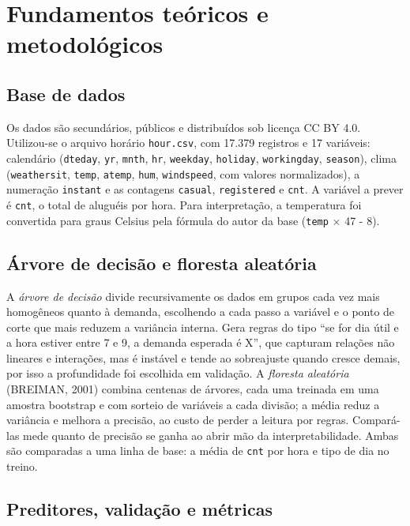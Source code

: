 \documentclass[
  portuguese,
  10pt,
  a4paper,
]{article}
\begin{document}
\section{Fundamentos teóricos e
metodológicos}\label{fundamentos-teuxf3ricos-e-metodoluxf3gicos}

\subsection{Base de dados}\label{base-de-dados}

Os dados são secundários, públicos e distribuídos sob licença CC BY 4.0.
Utilizou-se o arquivo horário \texttt{hour.csv}, com 17.379 registros e
17 variáveis: calendário (\texttt{dteday}, \texttt{yr}, \texttt{mnth},
\texttt{hr}, \texttt{weekday}, \texttt{holiday}, \texttt{workingday},
\texttt{season}), clima (\texttt{weathersit}, \texttt{temp},
\texttt{atemp}, \texttt{hum}, \texttt{windspeed}, com valores
normalizados), a numeração \texttt{instant} e as contagens
\texttt{casual}, \texttt{registered} e \texttt{cnt}. A variável a prever
é \texttt{cnt}, o total de aluguéis por hora. Para interpretação, a
temperatura foi convertida para graus Celsius pela fórmula do autor da
base (\texttt{temp} × 47 - 8).

\subsection{Árvore de decisão e floresta
aleatória}\label{uxe1rvore-de-decisuxe3o-e-floresta-aleatuxf3ria}

A \emph{árvore de decisão} divide recursivamente os dados em grupos cada
vez mais homogêneos quanto à demanda, escolhendo a cada passo a variável
e o ponto de corte que mais reduzem a variância interna. Gera regras do
tipo ``se for dia útil e a hora estiver entre 7 e 9, a demanda esperada
é X'', que capturam relações não lineares e interações, mas é instável e
tende ao sobreajuste quando cresce demais, por isso a profundidade foi
escolhida em validação. A \emph{floresta aleatória} (BREIMAN, 2001)
combina centenas de árvores, cada uma treinada em uma amostra bootstrap
e com sorteio de variáveis a cada divisão; a média reduz a variância e
melhora a precisão, ao custo de perder a leitura por regras. Compará-las
mede quanto de precisão se ganha ao abrir mão da interpretabilidade.
Ambas são comparadas a uma linha de base: a média de \texttt{cnt} por
hora e tipo de dia no treino.

\subsection{Preditores, validação e
métricas}\label{preditores-validauxe7uxe3o-e-muxe9tricas}
\end{document}
